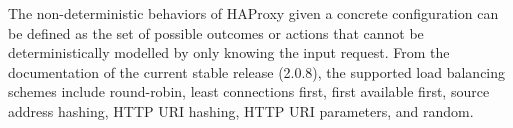 The non-deterministic behaviors of HAProxy given a concrete configuration can be
defined as the set of possible outcomes or actions that cannot be
deterministically modelled by only knowing the input request. From the
documentation of the current stable release (2.0.8), the supported load
balancing schemes include round-robin, least connections first, first available
first, source address hashing, HTTP URI hashing, HTTP URI parameters, and
random.

%
%

